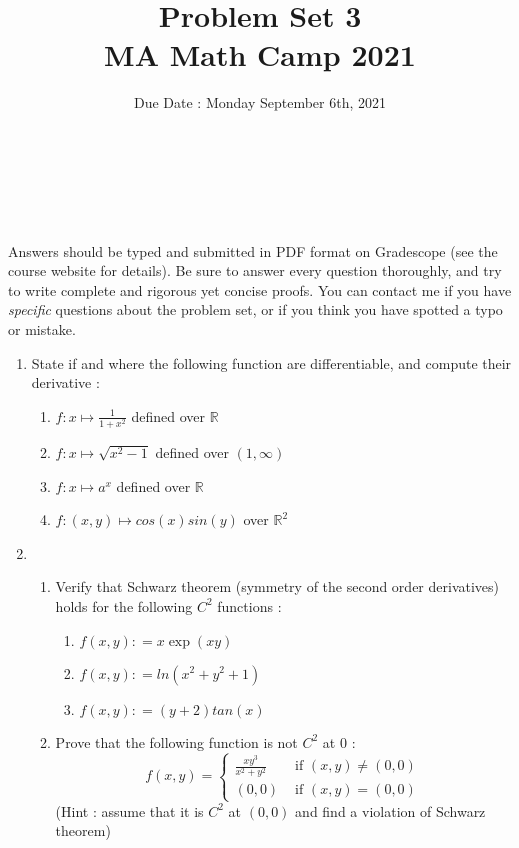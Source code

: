 \documentclass[11pt,letterpaper]{scrartcl}
\title{Problem Set 3 \\ MA Math Camp 2021 }
\author{ Due Date : Monday September 6th, 2021 }
\date{  }
\makeatletter
\newcommand{\reals}{\mathbb{R}}
\let\thetitle\@title
\let\theauthor\@author
\let\thedate\@date
\newcommand\makesimpletitle{%
\noindent 
\textbf{\large \thetitle} \\
\-\ \hspace{.2cm} { \large \theauthor } \\ 
\-\ \hspace{.2cm} { \normalsize \thedate }
}
\makeatother
\begin{document}


\makesimpletitle

Answers should be typed and submitted in PDF format on Gradescope (see the course website for details). Be sure to answer every question thoroughly, and try to write complete and rigorous yet concise proofs. You can contact me if you have \emph{specific} questions about the problem set, or if you think you have spotted a typo or mistake.

\vspace{.5cm}

\begin{enumerate}
	
	\item State if and where the following function are differentiable, and compute their derivative :
	\begin{enumerate}
		\item $f : x \mapsto \frac{1}{1+x^2}$ defined over $\reals$
		\item $f : x \mapsto \sqrt{x^2-1}$ defined over $(1,\infty)$
		\item $f : x \mapsto a^x$ defined over $\reals$
		\item $f : (x,y) \mapsto cos(x) sin(y)$ over $\reals^2$
	\end{enumerate}

	\item 
	\begin{enumerate}
		\item Verify that Schwarz theorem (symmetry of the second order derivatives) holds for the following $C^2$ functions :
		\begin{enumerate}
			\item $f(x,y) : = x \exp (xy)$ 
			\item $f(x,y) : = ln(x^2+y^2+1)$
			\item $f(x,y) : = (y+2) tan(x)$
		\end{enumerate}
		\item Prove that the following function is not $C^2$ at $0$ :
		\[
		f(x,y) = \begin{cases}
		\frac{x y^3}{x^2+y^2} & \text{ if } (x,y) \neq (0,0)
		\\
		(0,0) & \text{ if } (x,y) = (0,0)
		\end{cases}
		\]
		(Hint : assume that it is $C^2$ at $(0,0)$ and find a violation of Schwarz theorem)
	\end{enumerate}
	

\end{enumerate}
\end{document}
